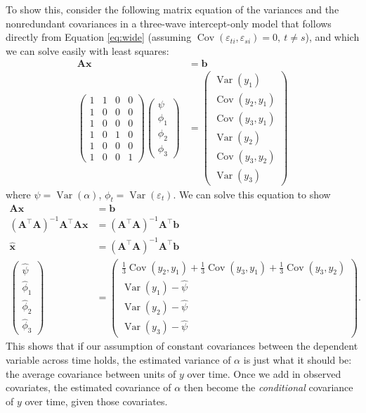 \documentclass[
  12pt,
  a4paper]{article}
\DeclareMathOperator{\Var}{\mathrm{Var}}
\DeclareMathOperator{\Cov}{\mathrm{Cov}}
\begin{document}
To show this, consider the following matrix equation of the variances
and the nonredundant covariances in a three-wave intercept-only model
that follows directly from Equation \eqref{eq:wide} (assuming
\(\Cov(\varepsilon_{ti},\varepsilon_{si}) = 0, \ t \ne s\)), and which
we can solve easily with least squares: \begin{align}
\bm{A}\bm{x} & = \bm{b} \\
\begin{pmatrix}
1 & 1 & 0 & 0 \\
1 & 0 & 0 & 0 \\
1 & 0 & 0 & 0 \\
1 & 0 & 1 & 0 \\
1 & 0 & 0 & 0 \\
1 & 0 & 0 & 1
\end{pmatrix}
\begin{pmatrix}
\psi \\
\phi_{1} \\
\phi_{2} \\
\phi_{3}
\end{pmatrix} & = 
\begin{pmatrix}
\Var(y_{1}) \\
\Cov(y_{2},y_{1}) \\
\Cov(y_{3},y_{1}) \\
\Var(y_{2}) \\
\Cov(y_{3},y_{2}) \\
\Var(y_{3})
\end{pmatrix}
\end{align} where \(\psi = \Var(\alpha)\),
\(\phi_{t} = \Var(\varepsilon_{t})\). We can solve this equation to show
\begin{align}
\bm{A}\bm{x} & = \bm{b} \\
(\bm{A}^{\intercal}\bm{A})^{-1}\bm{A}^{\intercal}\bm{A}\bm{x} & = (\bm{A}^{\intercal}\bm{A})^{-1}\bm{A}^{\intercal}\bm{b} \\
\hat{\bm{x}} & = (\bm{A}^{\intercal}\bm{A})^{-1}\bm{A}^{\intercal}\bm{b} \\
\begin{pmatrix}
\hat{\psi} \\
\hat{\phi}_{1} \\
\hat{\phi}_{2} \\
\hat{\phi}_{3}
\end{pmatrix} & = 
\begin{pmatrix}
\frac{1}{3}\Cov(y_{2},y_{1}) + \frac{1}{3}\Cov(y_{3},y_{1}) + \frac{1}{3}\Cov(y_{3},y_{2}) \\
\Var(y_{1}) - \hat{\psi} \\
\Var(y_{2}) - \hat{\psi} \\
\Var(y_{3}) - \hat{\psi}
\end{pmatrix}.
\end{align} This shows that if our assumption of constant covariances
between the dependent variable across time holds, the estimated variance
of \(\alpha\) is just what it should be: the average covariance between
units of \(y\) over time. Once we add in observed covariates, the
estimated covariance of \(\alpha\) then become the \textit{conditional}
covariance of \(y\) over time, given those covariates.
\end{document}
